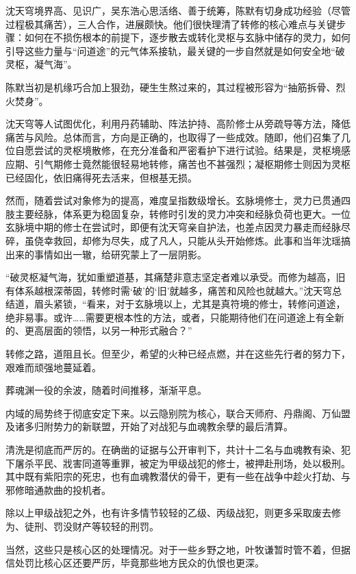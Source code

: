 沈天穹境界高、见识广，吴东浩心思活络、善于统筹，陈默有切身成功经验（尽管过程极其痛苦），三人合作，进展颇快。他们很快理清了转修的核心难点与关键步骤：如何在不损伤根本的前提下，逐步散去或转化灵枢与玄脉中储存的灵力，如何引导这些力量与“问道途”的元气体系接轨，最关键的一步自然就是如何安全地“破灵枢，凝气海”。

陈默当初是机缘巧合加上狠劲，硬生生熬过来的，其过程被形容为“抽筋拆骨、烈火焚身”。

沈天穹等人试图优化，利用丹药辅助、阵法护持、高阶修士从旁疏导等方法，降低痛苦与风险。总体而言，方向是正确的，也取得了一些成效。随即，他们召集了几位自愿尝试的灵枢境散修，在充分准备和严密看护下进行试验。结果是，灵枢境感应期、引气期修士竟然能很轻易地转修，痛苦也不甚强烈；凝枢期修士则因为灵枢已经固化，依旧痛得死去活来，但根基无损。

然而，随着尝试对象修为的提高，难度呈指数级增长。玄脉境修士，灵力已贯通四肢主要经脉，体系更为稳固复杂，转修时引发的灵力冲突和经脉负荷也更大。一位玄脉境中期的修士在尝试时，即便有沈天穹亲自护法，也差点因灵力暴走而经脉尽碎，虽侥幸救回，却修为尽失，成了凡人，只能从头开始修炼。此事和当年沈瑶搞出来的事情如出一辙，给研究蒙上了一层阴影。

“破灵枢凝气海，犹如重塑道基，其痛楚非意志坚定者难以承受。而修为越高，旧有体系越根深蒂固，转修时需‘破’的‘旧’就越多，痛苦和风险也就越大。”沈天穹总结道，眉头紧锁，“看来，对于玄脉境以上，尤其是真符境的修士，转修问道途，绝非易事。或许……需要更根本性的方法，或者，只能期待他们在问道途上有全新的、更高层面的领悟，以另一种形式融合？”

转修之路，道阻且长。但至少，希望的火种已经点燃，并在这些先行者的努力下，艰难而顽强地蔓延着。

\vspace{2em}

葬魂渊一役的余波，随着时间推移，渐渐平息。

内域的局势终于彻底安定下来。以云隐别院为核心，联合天师府、丹鼎阁、万仙盟及诸多归附势力的新联盟，开始了对战犯与血魂教余孽的最后清算。

清洗是彻底而严厉的。在确凿的证据与公开审判下，共计十二名与血魂教有染、犯下屠杀平民、戕害同道等重罪，被定为甲级战犯的修士，被押赴刑场，处以极刑。其中既有紫阳宗的死忠，也有血魂教潜伏的骨干，更有一些在战争中趁火打劫、与邪修暗通款曲的投机者。

除以上甲级战犯之外，也有许多情节较轻的乙级、丙级战犯，则更多采取废去修为、徒刑、罚没财产等较轻的刑罚。

当然，这些只是核心区的处理情况。对于一些乡野之地，叶牧谦暂时管不着，但据信处罚比核心区还要严厉，毕竟那些地方民众的仇恨也更深。

